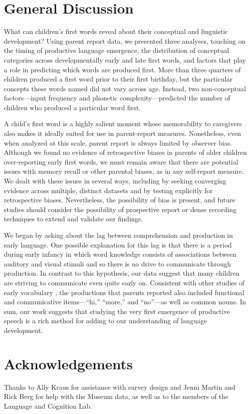 \documentclass[10pt,letterpaper]{article}
\begin{document}
\section{General Discussion}

What can children's first words reveal about their conceptual and linguistic development? Using parent report data, we presented three analyses, touching on the timing of productive language emergence, the distribution of conceptual categories across developmentally early and late first words, and factors that play a role in predicting which words are produced first. More than three quarters of children produced a first word prior to their first birthday, but the particular concepts these words named did not vary across age. Instead, two non-conceptual factors---input frequency and phonetic complexity---predicted the number of children who produced a particular word first.

A child's first word is a highly salient moment whose memorability to caregivers also makes it ideally suited for use in parent-report measures. Nonetheless, even when analyzed at this scale, parent report is always limited by observer bias. Although we found no evidence of retrospective biases in parents of older children over-reporting early first words, we must remain aware that there are potential issues with memory recall or other parental biases, as in any self-report measure. We dealt with these issues in several ways, including by seeking converging evidence across multiple, distinct datasets and by testing explicitly for retrospective biases. Nevertheless, the possibility of bias is present, and future studies should consider the possibility of prospective report or dense recording techniques to extend and validate our findings. 

We began by asking about the lag between comprehension and production in early language. One possible explanation for this lag is that there is a period during early infancy in which word knowledge consists of associations between auditory and visual stimuli and so there is no drive to communicate through production. In contrast to this hypothesis, our data suggest that many children are striving to communicate even quite early on. Consistent with other studies of early vocabulary \cite{tardif2007}, the productions that parents reported also included functional and communicative items---``hi,'' ``more,'' and ``no''---as well as common nouns. In sum, our work suggests that studying the very first emergence of productive speech is a rich method for adding to our understanding of language development.

\section{Acknowledgements}

Thanks to Ally Kraus for assistance with survey design and Jenni Martin and Rick Berg for help with the Museum data, as well as to the members of the Language and Cognition Lab.



\setlength{\bibleftmargin}{.125in}
\setlength{\bibindent}{-\bibleftmargin}


\end{document}
